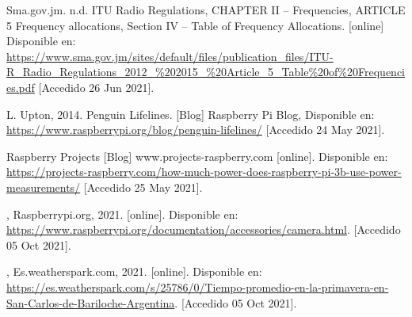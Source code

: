\begin{flushleft}
\begin{thebibliography}{9}
Sma.gov.jm. n.d. ITU Radio Regulations, CHAPTER II – Frequencies, ARTICLE 5 Frequency allocations, Section IV – Table of Frequency Allocations. [online] Disponible en: \href{https://www.sma.gov.jm/sites/default/files/publication_files/ITU-R_Radio_Regulations_2012_\%202015_\%20Article_5_Table\%20of\%20Frequencies.pdf}{https://www.sma.gov.jm/sites/default/files/publication\_files/ITU-R\_Radio\_Regulations\_2012\_\%202015\_\%20Article\_5\_Table\%20of\%20Frequencies.pdf} [Accedido 26 Jun 2021].

L. Upton, 2014. Penguin Lifelines. [Blog] Raspberry Pi Blog, Disponible en: \href{https://www.raspberrypi.org/blog/penguin-lifelines/}{https://www.raspberrypi.org/blog/penguin-lifelines/} [Accedido 24 May 2021].

Raspberry Projects [Blog] www.projects-raspberry.com [online]. Disponible en: \href{https://projects-raspberry.com/how-much-power-does-raspberry-pi-3b-use-power-measurements/}{https://projects-raspberry.com/how-much-power-does-raspberry-pi-3b-use-power-measurements/} [Accedido 25 May 2021].

, Raspberrypi.org, 2021. [online]. Disponible en: \href{https://www.raspberrypi.org/documentation/accessories/camera.html}{https://www.raspberrypi.org/documentation/accessories/camera.html}. [Accedido 05  Oct 2021].

, Es.weatherspark.com, 2021. [online]. Disponible en: \href{https://es.weatherspark.com/s/25786/0/Tiempo-promedio-en-la-primavera-en-San-Carlos-de-Bariloche-Argentina}{https://es.weatherspark.com/s/25786/0/Tiempo-promedio-en-la-primavera-en-San-Carlos-de-Bariloche-Argentina}. [Accedido 05 Oct 2021].




\end{thebibliography}
\end{flushleft}

%
